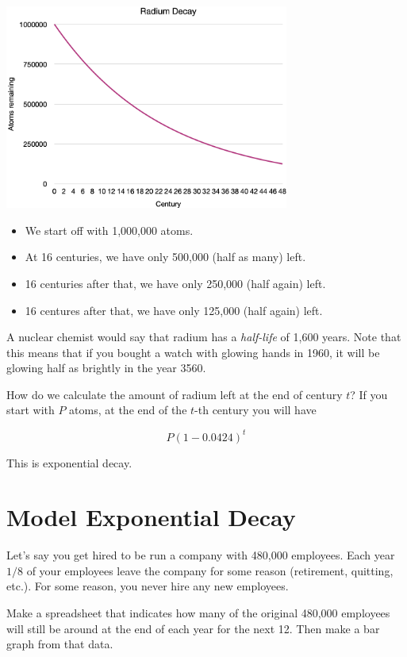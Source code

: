 \includegraphics[width=0.7\textwidth]{radium_decay.png}
 
\begin{itemize}
\item We start off with 1,000,000 atoms.
\item At 16 centuries, we have only 500,000 (half as many) left.
\item 16 centuries after that, we have only 250,000 (half again) left.
\item 16 centures after that, we have only 125,000 (half again) left.
\end{itemize}

A nuclear chemist would say that radium has a \textit{half-life} of
1,600 years. Note that this means that if you bought a watch with
glowing hands in 1960, it will be glowing half as brightly in the year
3560.

How do we calculate the amount of radium left at the end of century
$t$? If you start with $P$ atoms, at the end of the $t$-th century you
will have

$$P\left(1 - 0.0424\right)^t$$

This is exponential decay.

\section{Model Exponential Decay}

Let's say you get hired to be run a company with 480,000
employees. Each year $1/8$ of your employees leave the company for
some reason (retirement, quitting, etc.). For some reason, you never
hire any new employees.

Make a spreadsheet that indicates how many of the original 480,000
employees will still be around at the end of each year for the next 12.  Then make a
bar graph from that data.
